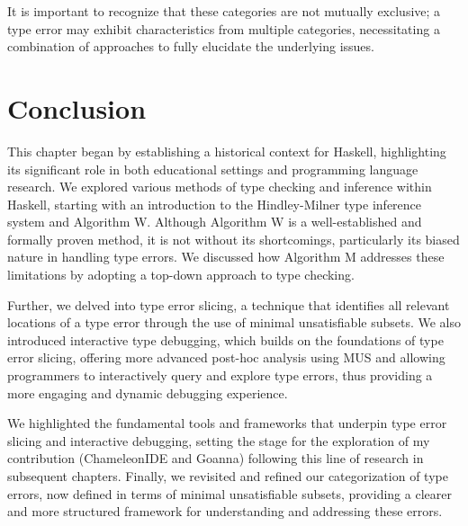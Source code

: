 It is important to recognize that these categories are not mutually exclusive; a type error may exhibit characteristics from multiple categories, necessitating a combination of approaches to fully elucidate the underlying issues.

\section{Conclusion}

This chapter began by establishing a historical context for Haskell, highlighting its significant role in both educational settings and programming language research. We explored various methods of type checking and inference within Haskell, starting with an introduction to the Hindley-Milner type inference system and Algorithm W. Although Algorithm W is a well-established and formally proven method, it is not without its shortcomings, particularly its biased nature in handling type errors. We discussed how Algorithm M addresses these limitations by adopting a top-down approach to type checking.

Further, we delved into type error slicing, a technique that identifies all relevant locations of a type error through the use of minimal unsatisfiable subsets. We also introduced interactive type debugging, which builds on the foundations of type error slicing, offering more advanced post-hoc analysis using MUS and allowing programmers to interactively query and explore type errors, thus providing a more engaging and dynamic debugging experience.

We highlighted the fundamental tools and frameworks that underpin type error slicing and interactive debugging, setting the stage for the exploration of my contribution (ChameleonIDE and Goanna) following this line of research in subsequent chapters. Finally, we revisited and refined our categorization of type errors, now defined in terms of minimal unsatisfiable subsets, providing a clearer and more structured framework for understanding and addressing these errors.

